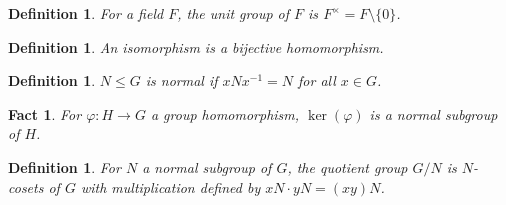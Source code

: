 \documentclass[a4paper,12pt]{article}
\theoremstyle{sltheorem}
\newtheorem{definition}[theorem]{Definition}
\newtheorem{fact}[theorem]{Fact}
\begin{document}
\begin{definition}
    For a field $F$, the \textit{unit group} of $F$ is $F^{\times} = F \setminus \{0\}$.
\end{definition}

\begin{definition}
    An \textit{isomorphism} is a bijective homomorphism.
\end{definition}

\begin{definition}
    $N \leq G$ is \textit{normal} if $xNx^{-1} = N$ for all $x \in G$.
\end{definition}

\begin{fact}
    For $\varphi: H \rightarrow G$ a  group homomorphism, $\ker(\varphi)$ is a normal subgroup of $H$.
\end{fact}

\begin{definition}
    For $N$ a normal subgroup of $G$, the \textit{quotient group} $G/N$  is $N$-cosets of $G$ with multiplication defined by $xN \cdot yN = (xy)N$.
\end{definition}
\end{document}
